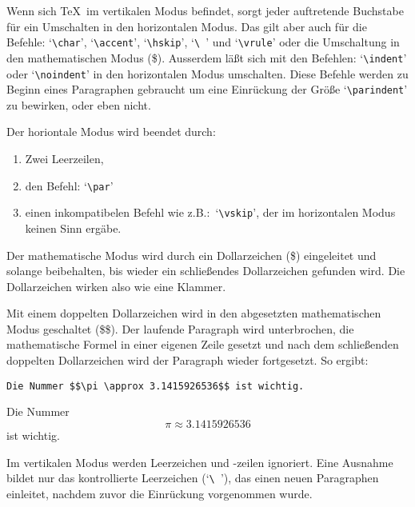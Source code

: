 Wenn sich \TeX\ im vertikalen Modus befindet, sorgt jeder auftretende
Buchstabe f\"ur ein Umschalten in den horizontalen Modus. Das gilt aber
auch f\"ur die Befehle: `\verb|\char|', 
`\verb|\accent|',
`\verb|\hskip|', `\verb*|\ |' und
`\verb|\vrule|' oder die Umschaltung
in den mathematischen Modus (\$). Ausserdem l\"a\ss{}t sich mit den
Befehlen: 
`\verb|\indent|' oder 
`\verb|\noindent|' in den horizontalen
Modus umschalten. Diese Befehle werden zu Beginn eines Paragraphen
gebraucht um eine 
Einr\"uckung der Gr\"o\ss{}e 
`\verb|\parindent|' zu
bewirken, oder eben nicht.

Der horiontale Modus wird beendet durch:
\begin{enumerate}
\item Zwei Leerzeilen,
\item den Befehl: `\verb|\par|'
\item einen inkompatibelen Befehl wie z.B.:\
`\verb|\vskip|', der im
horizontalen Modus keinen Sinn erg\"abe.
\end{enumerate}

Der mathematische Modus wird durch ein 
Dollarzeichen (\$) eingeleitet
und solange beibehalten, bis wieder ein schlie\ss{}endes Dollarzeichen
gefunden wird. Die Dollarzeichen wirken also wie eine
Klammer.

Mit einem doppelten 
Dollarzeichen wird in den
abgesetzten
mathematischen Modus geschaltet (\$\$). Der laufende Paragraph wird
unterbrochen, die mathematische Formel in einer eigenen Zeile gesetzt
und nach dem schlie\ss{}enden doppelten Dollarzeichen wird der Paragraph
wieder fortgesetzt. So ergibt:
\begin{verbatim}
Die Nummer $$\pi \approx 3.1415926536$$ ist wichtig.
\end{verbatim}
Die Nummer $$\pi \approx 3.1415926536$$ ist wichtig.

Im vertikalen Modus werden 
Leerzeichen und -zeilen ignoriert. Eine
Ausnahme bildet nur das kontrollierte Leerzeichen (`\verb*|\ |'), das
einen neuen Paragraphen einleitet, nachdem zuvor die
Einr\"uckung
vorgenommen wurde.

